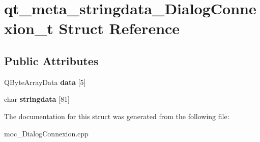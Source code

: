 \section{qt\-\_\-meta\-\_\-stringdata\-\_\-\-Dialog\-Connexion\-\_\-t Struct Reference}
\label{structqt__meta__stringdata___dialog_connexion__t}
\subsection*{Public Attributes}
\begin{DoxyCompactItemize}
\item 
Q\-Byte\-Array\-Data {\bfseries data} [5]\label{structqt__meta__stringdata___dialog_connexion__t_af163bd195ededb81fbbcdcf222e9a754}

\item 
char {\bfseries stringdata} [81]\label{structqt__meta__stringdata___dialog_connexion__t_a4b0d3c67a41f01ea4e6f6f13a645ee74}

\end{DoxyCompactItemize}


The documentation for this struct was generated from the following file\-:\begin{DoxyCompactItemize}
\item 
moc\-\_\-\-Dialog\-Connexion.\-cpp\end{DoxyCompactItemize}
